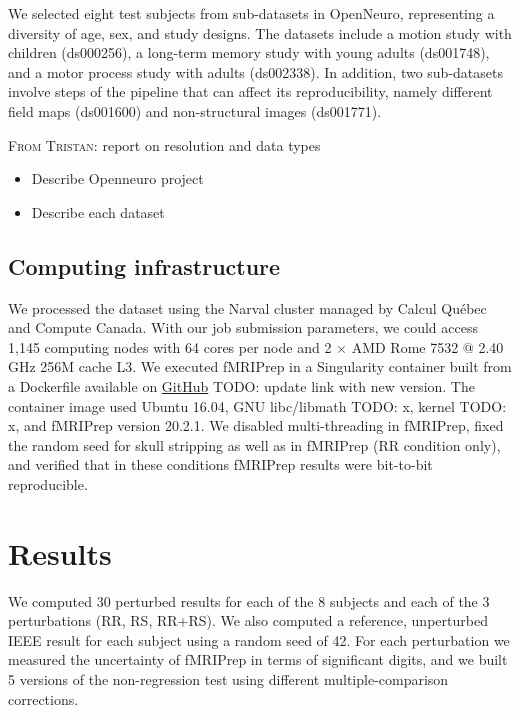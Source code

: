 \documentclass{article}
\newcommand{\TODO}[1]{\color{red}\textsc{TODO:} #1\color{black}\xspace}
\newcommand{\TG}[1]{\color{blue}\textsc{From Tristan:} #1\color{black}\xspace}
\newcommand{\fmriprep}{fMRIPrep \xspace}
\begin{document}
We selected eight test subjects from sub-datasets in OpenNeuro, representing a diversity of age, sex, and study designs. The datasets include a motion study with children (ds000256), a long-term memory study with young adults (ds001748), and a motor process study with adults (ds002338). In addition, two sub-datasets involve steps of the pipeline that can affect its reproducibility, namely different field maps (ds001600) and non-structural images (ds001771). 

\TG{report on resolution and data types}

\begin{itemize}
    \item Describe Openneuro project
    \item Describe each dataset
\end{itemize}

\subsection{Computing infrastructure}

We processed the dataset using the Narval cluster managed by Calcul Qu\'ebec and Compute Canada. With our job submission parameters, we could access 1,145 computing nodes with 64 cores per node and 2 $\times$ AMD Rome 7532 @ 2.40 GHz 256M cache L3. We executed \fmriprep in a Singularity container built from a Dockerfile available on  \href{https://github.com/SIMEXP/fmriprep-reproducibility/blob/master/fmriprep-reproducibility/containers/Dockerfile}{GitHub} \TODO{update link with new version}. The container image used Ubuntu 16.04, GNU libc/libmath \TODO{x}, kernel \TODO{x}, and fMRIPrep version 20.2.1. We disabled multi-threading in fMRIPrep, fixed the random seed for skull stripping as well as in fMRIPrep (RR condition only), and verified that in these conditions fMRIPrep results were bit-to-bit reproducible. 

\section{Results}

We computed 30 perturbed results for each of the 8 subjects and each of the 3 perturbations (RR, RS, RR+RS). We also computed a reference, unperturbed IEEE result for each subject using a random seed of 42. For each perturbation we measured the uncertainty of fMRIPrep in terms of significant digits, and we built 5 versions of the non-regression test using different multiple-comparison corrections.
\end{document}
